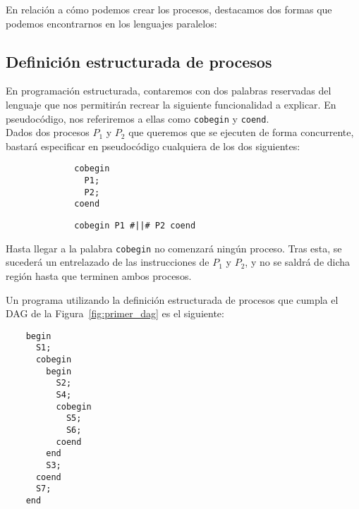 \noindent
En relación a cómo podemos crear los procesos, destacamos dos formas que podemos encontrarnos en los lenguajes paralelos:

\subsection{Definición estructurada de procesos}
En programación estructurada, contaremos con dos palabras reservadas del lenguaje que nos permitirán recrear la siguiente funcionalidad a explicar. En pseudocódigo, nos referiremos a ellas como \verb|cobegin| y \verb|coend|.\\

Dados dos procesos $P_1$ y $P_2$ que queremos que se ejecuten de forma concurrente, bastará especificar en pseudocódigo cualquiera de los dos siguientes:
\begin{figure}[H]
    \setlength{\columnsep}{1cm}
    \begin{multicols}{2}
     \begin{verbatim}
        cobegin
          P1; 
          P2; 
        coend
    \end{verbatim}       
    \begin{verbatim}
        cobegin P1 #||# P2 coend
    \end{verbatim}       
    \end{multicols}
\end{figure}

Hasta llegar a la palabra \verb|cobegin| no comenzará ningún proceso. Tras esta, se sucederá un entrelazado de las instrucciones de $P_1$ y $P_2$, y no se saldrá de dicha región hasta que terminen ambos procesos.

\begin{ejemplo}
    Un programa utilizando la definición estructurada de procesos que cumpla el DAG de la Figura~\ref{fig:primer_dag} es el siguiente:
    \begin{verbatim}
    begin
      S1;
      cobegin
        begin
          S2;
          S4;
          cobegin
            S5;
            S6;
          coend
        end
        S3;
      coend
      S7;
    end
    \end{verbatim}
\end{ejemplo}

